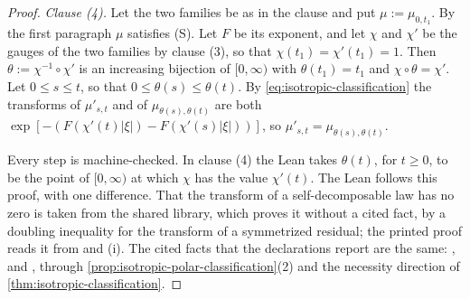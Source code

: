 \begin{proof}
\emph{Clause (4).} Let the two families be as in the clause and put $\mu := \mu_{0,t_1}$. By
the first paragraph $\mu$ satisfies (S). Let $F$ be its exponent, and let $\chi$ and $\chi'$ be
the gauges of the two families by clause (3), so that $\chi(t_1) = \chi'(t_1) = 1$. Then
$\theta := \chi^{-1} \circ \chi'$ is an increasing bijection of $[0,\infty)$ with
$\theta(t_1) = t_1$ and $\chi \circ \theta = \chi'$. Let $0 \le s \le t$, so that
$0 \le \theta(s) \le \theta(t)$. By \ref{eq:isotropic-classification} the transforms of
$\mu'_{s,t}$ and of $\mu_{\theta(s),\theta(t)}$ are both
$\exp[-(F(\chi'(t)|\xi|) - F(\chi'(s)|\xi|))]$, so $\mu'_{s,t} = \mu_{\theta(s),\theta(t)}$.

Every step is machine-checked. In clause (4) the Lean takes $\theta(t)$, for $t \ge 0$, to be
the point of $[0,\infty)$ at which $\chi$ has the value $\chi'(t)$. The Lean follows this proof,
with one difference. That the
transform of a self-decomposable law has no zero is taken from the shared library, which proves
it without a cited fact, by a doubling inequality for the transform of a symmetrized residual; the printed proof reads
it from  and (i). The cited facts that the declarations report are the
same: ,  and , through
\ref{prop:isotropic-polar-classification}(2) and the necessity direction of
\ref{thm:isotropic-classification}.
\end{proof}


